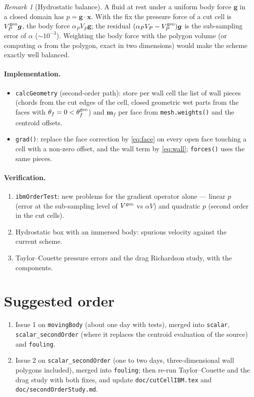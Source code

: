 \documentclass[11pt,a4paper]{article}
\theoremstyle{remark}
\newtheorem{remark}{Remark}
\newcommand{\xx}{\bm{x}}
\newcommand{\code}[1]{\texttt{#1}}
\begin{document}
\begin{remark}[Hydrostatic balance]
A fluid at rest under a uniform body force $\bm g$ in a closed domain has $p=\bm g\cdot\xx$. With
the fix the pressure force of a cut cell is $V^{\rm geo}_P\bm g$, the body force $\alpha_PV_P\bm
g$; the residual $(\alpha_PV_P-V^{\rm geo}_P)\bm g$ is the sub-sampling error of $\alpha$
($\sim10^{-3}$). Weighting the body force with the polygon volume (or computing $\alpha$ from the
polygon, exact in two dimensions) would make the scheme exactly well balanced.
\end{remark}

\paragraph{Implementation.}
\begin{itemize}\itemsep1pt
\item \code{calcGeometry} (second-order path): store per wall cell the list of wall pieces
      (chords from the cut edges of the cell, closed geometric wet parts from the faces with
      $\theta_f=0<\theta^{\rm geo}_f$) and $\bm m_f$ per face from \code{mesh.weights()} and the
      centroid offsets.
\item \code{grad()}: replace the face correction by \eqref{eq:face} on every open face touching
      a cell with a non-zero offset, and the wall term by \eqref{eq:wall}; \code{forces()} uses
      the same pieces.
\end{itemize}

\paragraph{Verification.}
\begin{enumerate}\itemsep1pt
\item \code{ibmOrderTest}: new problems for the gradient operator alone --- linear $p$ (error at
      the sub-sampling level of $V^{\rm geo}$ vs $\alpha V$) and quadratic $p$ (second order in
      the cut cells).
\item Hydrostatic box with an immersed body: spurious velocity against the current scheme.
\item Taylor--Couette pressure errors and the drag Richardson study, with the components.
\end{enumerate}

\section{Suggested order}

\begin{enumerate}\itemsep1pt
\item Issue 1 on \code{movingBody} (about one day with tests), merged into \code{scalar},
      \code{scalar\_secondOrder} (where it replaces the centroid evaluation of the source) and
      \code{fouling}.
\item Issue 2 on \code{scalar\_secondOrder} (one to two days, three-dimensional wall polygons
      included), merged into \code{fouling}; then re-run Taylor--Couette and the drag study
      with both fixes, and update \code{doc/cutCellIBM.tex} and \code{doc/secondOrderStudy.md}.
\end{enumerate}
\end{document}

